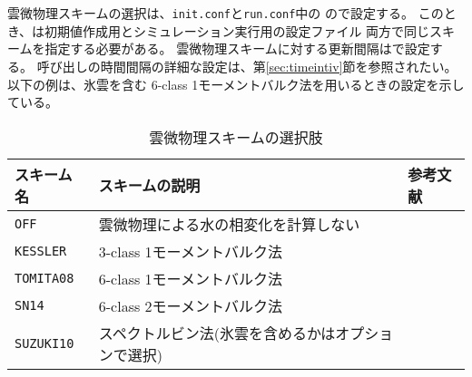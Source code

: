 \section{\SubsecMicrophysicsSetting} \label{sec:basic_usel_microphys}
雲微物理スキームの選択は、\verb|init.conf|と\verb|run.conf|中の
ので設定する。
このとき、は初期値作成用とシミュレーション実行用の設定ファイル
両方で同じスキームを指定する必要がある。
雲微物理スキームに対する更新間隔はで設定する。
呼び出しの時間間隔の詳細な設定は、第\ref{sec:timeintiv}節を参照されたい。
以下の例は、氷雲を含む 6-class 1モーメントバルク法を用いるときの設定を示している。\\


\begin{table}[h]
\begin{center}
  \caption{雲微物理スキームの選択肢}
  \label{tab:nml_atm_mp}
  \begin{tabularx}{150mm}{lXX} \hline
    \rowcolor[gray]{0.9}  スキーム名 & スキームの説明 & 参考文献\\ \hline
     \verb|OFF|      & 雲微物理による水の相変化を計算しない &  \\
     \verb|KESSLER|  & 3-class 1モーメントバルク法 & \citet{kessler_1969} \\
     \verb|TOMITA08| & 6-class 1モーメントバルク法 & \citet{tomita_2008} \\
     \verb|SN14|     & 6-class 2モーメントバルク法 & \citet{sn_2014} \\
     \verb|SUZUKI10| & スペクトルビン法(氷雲を含めるかはオプションで選択) & \citet{suzuki_etal_2010} \\
    \hline
  \end{tabularx}
\end{center}
\end{table}

